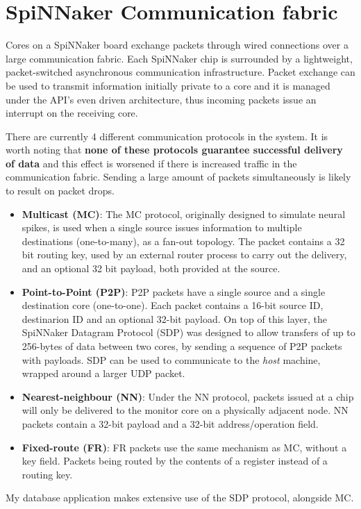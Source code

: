 \section{SpiNNaker Communication fabric}
\label{sec:comm_fabric}

Cores on a SpiNNaker board exchange packets through wired connections over a large communication fabric. Each SpiNNaker chip is surrounded by a lightweight, packet-switched asynchronous communication infrastructure.\cite{spinnchip} Packet exchange can be used to transmit information initially private to a core and it is managed under the API's even driven architecture, thus incoming packets issue an interrupt on the receiving core.

There are currently 4 different communication protocols in the system. It is worth noting that \textbf{none of these protocols guarantee successful delivery of data} and this effect is worsened if there is increased traffic in the communication fabric. Sending a large amount of packets simultaneously is likely to result on packet drops.

\begin{itemize}
\item \textbf{Multicast (MC)}: The MC protocol, originally designed to simulate neural spikes, is used when a single source issues information to multiple destinations (one-to-many), as a fan-out topology.\cite{overviewspinn} The packet contains a 32 bit routing key, used by an external router process to carry out the delivery, and an optional 32 bit payload, both provided at the source.

\item \textbf{Point-to-Point (P2P)}: P2P packets have a single source and a single destination core (one-to-one). Each packet contains a 16-bit source ID, destinarion ID and an optional 32-bit payload.\cite{datasheet}
On top of this layer, the SpiNNaker Datagram Protocol (SDP) was designed to allow transfers of up to 256-bytes of data between two cores, by sending a sequence of P2P packets with payloads.\cite{sdp} SDP can be used to communicate to the \textit{host} machine, wrapped around a larger UDP packet.

\item \textbf{Nearest-neighbour (NN)}: Under the NN protocol, packets issued at a chip will only be delivered to the monitor core on a physically adjacent node.\cite{overviewspinn} NN packets contain a 32-bit payload and a 32-bit address/operation field.\cite{datasheet}

\item \textbf{Fixed-route (FR)}: FR packets use the same mechanism as MC, without a key field. Packets being routed by the contents of a register instead of a routing key. 
\end{itemize}

My database application makes extensive use of the SDP protocol, alongside MC.




